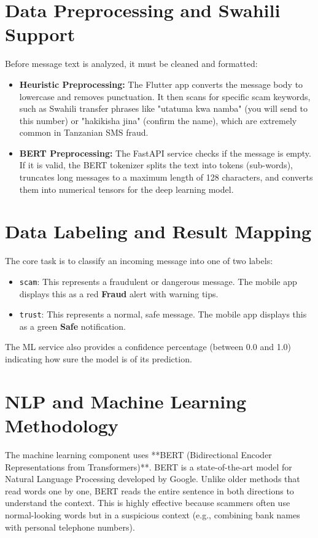 \section{Data Preprocessing and Swahili Support}
Before message text is analyzed, it must be cleaned and formatted:
\begin{itemize}
  \item \textbf{Heuristic Preprocessing:} The Flutter app converts the message body to lowercase and removes punctuation. It then scans for specific scam keywords, such as Swahili transfer phrases like "utatuma kwa namba" (you will send to this number) or "hakikisha jina" (confirm the name), which are extremely common in Tanzanian SMS fraud.
  \item \textbf{BERT Preprocessing:} The FastAPI service checks if the message is empty. If it is valid, the BERT tokenizer splits the text into tokens (sub-words), truncates long messages to a maximum length of 128 characters, and converts them into numerical tensors for the deep learning model.
\end{itemize}

\section{Data Labeling and Result Mapping}
The core task is to classify an incoming message into one of two labels:
\begin{itemize}
  \item \texttt{scam}: This represents a fraudulent or dangerous message. The mobile app displays this as a red \textbf{Fraud} alert with warning tips.
  \item \texttt{trust}: This represents a normal, safe message. The mobile app displays this as a green \textbf{Safe} notification.
\end{itemize}
The ML service also provides a confidence percentage (between 0.0 and 1.0) indicating how sure the model is of its prediction.

\section{NLP and Machine Learning Methodology}
The machine learning component uses **BERT (Bidirectional Encoder Representations from Transformers)**. BERT is a state-of-the-art model for Natural Language Processing developed by Google. Unlike older methods that read words one by one, BERT reads the entire sentence in both directions to understand the context. This is highly effective because scammers often use normal-looking words but in a suspicious context (e.g., combining bank names with personal telephone numbers).

